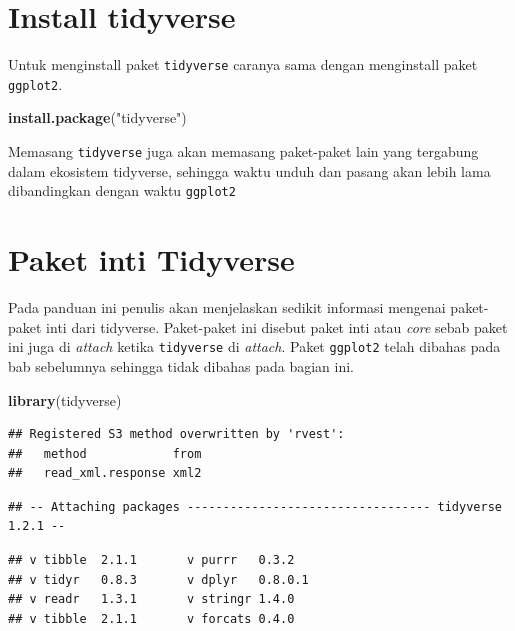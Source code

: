 \documentclass[]{book}
\newenvironment{Shaded}{\begin{snugshade}}{\end{snugshade}}
\newcommand{\KeywordTok}[1]{\textcolor[rgb]{0.13,0.29,0.53}{\textbf{#1}}}
\newcommand{\StringTok}[1]{\textcolor[rgb]{0.31,0.60,0.02}{#1}}
\newcommand{\NormalTok}[1]{#1}
\begin{document}
\section{Install tidyverse}\label{install-tidyverse}

Untuk menginstall paket \texttt{tidyverse} caranya sama dengan
menginstall paket \texttt{ggplot2}.

\begin{Shaded}
\begin{Highlighting}[]
\KeywordTok{install.package}\NormalTok{(}\StringTok{"tidyverse"}\NormalTok{)}
\end{Highlighting}
\end{Shaded}

Memasang \texttt{tidyverse} juga akan memasang paket-paket lain yang
tergabung dalam ekosistem tidyverse, sehingga waktu unduh dan pasang
akan lebih lama dibandingkan dengan waktu \texttt{ggplot2}

\section{Paket inti Tidyverse}\label{paket-inti-tidyverse}

Pada panduan ini penulis akan menjelaskan sedikit informasi mengenai
paket-paket inti dari tidyverse. Paket-paket ini disebut paket inti atau
\emph{core} sebab paket ini juga di \emph{attach} ketika
\texttt{tidyverse} di \emph{attach}. Paket \texttt{ggplot2} telah
dibahas pada bab sebelumnya sehingga tidak dibahas pada bagian ini.

\begin{Shaded}
\begin{Highlighting}[]
\KeywordTok{library}\NormalTok{(tidyverse)}
\end{Highlighting}
\end{Shaded}

\begin{verbatim}
## Registered S3 method overwritten by 'rvest':
##   method            from
##   read_xml.response xml2
\end{verbatim}

\begin{verbatim}
## -- Attaching packages ---------------------------------- tidyverse 1.2.1 --
\end{verbatim}

\begin{verbatim}
## v tibble  2.1.1       v purrr   0.3.2  
## v tidyr   0.8.3       v dplyr   0.8.0.1
## v readr   1.3.1       v stringr 1.4.0  
## v tibble  2.1.1       v forcats 0.4.0
\end{verbatim}
\end{document}
